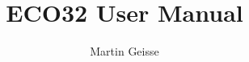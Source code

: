 \documentclass{amsbook}
\begin{document}
\title{ECO32 User Manual}
\author{Martin Geisse}
\maketitle

\newcommand{\mylabel}[1]{\label{#1}}
\newcommand{\myref}[2]{\hyperref[#2]{Chapter #1, Section \ref{#2}}}

\newcommand{\definition}[1]{{\it #1}}
\newcommand{\name}[1]{{\it #1}}

\newcommand{\eco}{{\sc ECO32} }
\newcommand{\ecox}{{\sc ECO32}}
\newcommand{\pc}{{\sc PC} }
\newcommand{\pcx}{{\sc PC}}
\newcommand{\psw}{{\sc PSW} }
\newcommand{\pswx}{{\sc PSW}}
\newcommand{\mmu}{{\sc MMU} }
\newcommand{\mmux}{{\sc MMU}}

\tableofcontents









\end{document}
